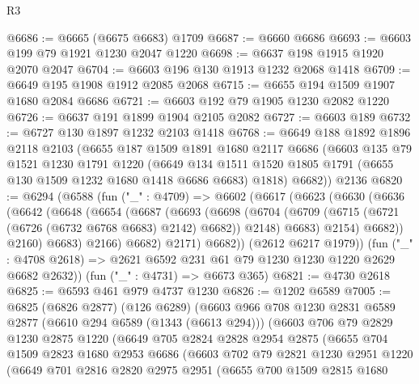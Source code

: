 \begin{lexlean}{R3}
\begin{coremodule}
@6686 := @6665 (@6675 @6683) @1709
@6687 := @6660 @6686
@6693 := @6603 @199 @79 @1921 @1230 @2047 @1220
@6698 := @6637 @198 @1915 @1920 @2070 @2047
@6704 := @6603 @196 @130 @1913 @1232 @2068 @1418
@6709 := @6649 @195 @1908 @1912 @2085 @2068
@6715 := @6655 @194 @1509 @1907 @1680 @2084 @6686
@6721 := @6603 @192 @79 @1905 @1230 @2082 @1220
@6726 := @6637 @191 @1899 @1904 @2105 @2082
@6727 := @6603 @189
@6732 := @6727 @130 @1897 @1232 @2103 @1418
@6768 := @6649
    @188
    @1892
    @1896
    @2118
    @2103
    (@6655
      @187
      @1509
      @1891
      @1680
      @2117
      @6686
      (@6603
        @135
        @79
        @1521
        @1230
        @1791
        @1220
        (@6649 @134 @1511 @1520 @1805 @1791 (@6655 @130 @1509 @1232 @1680 @1418 @6686 @6683) @1818)
        @6682))
    @2136
@6820 := @6294
    (@6588
      (fun ("_" : @4709) =>
      @6602
        (@6617
          (@6623
            (@6630
              (@6636
                (@6642
                  (@6648
                    (@6654
                      (@6687
                        (@6693
                          (@6698
                            (@6704
                              (@6709 (@6715 (@6721 (@6726 (@6732 @6768 @6683) @2142) @6682)) @2148)
                              @6683)
                            @2154)
                          @6682))
                      @2160)
                    @6683)
                  @2166)
                @6682)
              @2171)
            @6682))
        (@2612 @6217 @1979))
      (fun ("_" : @4708 @2618) => @2621 @6592 @231 @61 @79 @1230 @1230 @1220 @2629 @6682 @2632))
    (fun ("_" : @4731) => @6673 @365)
@6821 := @4730 @2618
@6825 := @6593 @461 @979 @4737 @1230
@6826 := @1202 @6589
@7005 := @6825
    (@6826 @2877)
    (@126 @6289)
    (@6603
      @966
      @708
      @1230
      @2831
      @6589
      @2877
      (@6610 @294 @6589 (@1343 (@6613 @294)))
      (@6603
        @706
        @79
        @2829
        @1230
        @2875
        @1220
        (@6649
          @705
          @2824
          @2828
          @2954
          @2875
          (@6655
            @704
            @1509
            @2823
            @1680
            @2953
            @6686
            (@6603
              @702
              @79
              @2821
              @1230
              @2951
              @1220
              (@6649
                @701
                @2816
                @2820
                @2975
                @2951
                (@6655
                  @700
                  @1509
                  @2815
                  @1680

\end{coremodule}
\end{lexlean}
